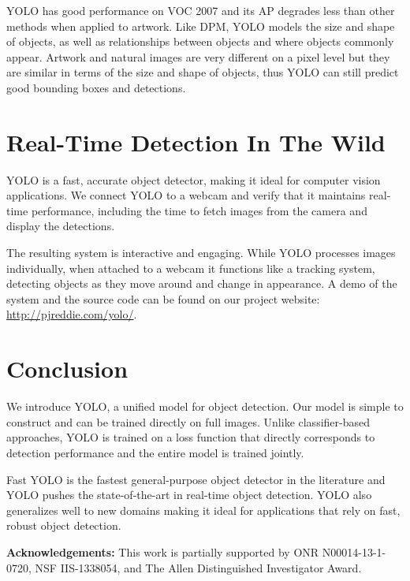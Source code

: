 \documentclass[10pt,twocolumn,letterpaper]{article}
\begin{document}
YOLO has good performance on VOC 2007 and its AP degrades less than other methods when applied to artwork. Like DPM, YOLO models the size and shape
of objects, as well as relationships between objects and where objects commonly appear. Artwork and natural images are very different on a pixel level but they are similar in terms of the size and shape of objects, thus YOLO can still predict good bounding boxes and detections.

\section{Real-Time Detection In The Wild}

YOLO is a fast, accurate object detector, making it ideal for computer vision applications. We connect YOLO to a webcam and verify that it maintains real-time performance, including the time to fetch images from the camera and display the detections.

The resulting system is interactive and engaging. While YOLO processes images individually, when attached to a webcam it functions like a tracking system, detecting objects as they move around and change in appearance. A demo of the system and the source code can be found on our project website: \url{http://pjreddie.com/yolo/}.



\section{Conclusion}

We introduce YOLO, a unified model for object detection. Our model is simple to construct and can be trained directly on full images. Unlike classifier-based approaches, YOLO is trained on a loss function that directly corresponds to detection performance and the entire model is trained jointly.

Fast YOLO is the fastest general-purpose object detector in the literature and YOLO pushes the state-of-the-art in real-time object detection. YOLO also generalizes well to new domains making it ideal for applications that rely on fast, robust object detection.

\noindent\textbf{Acknowledgements:} This work is partially supported by ONR N00014-13-1-0720, NSF IIS-1338054, and The Allen Distinguished Investigator Award.

\end{document}

